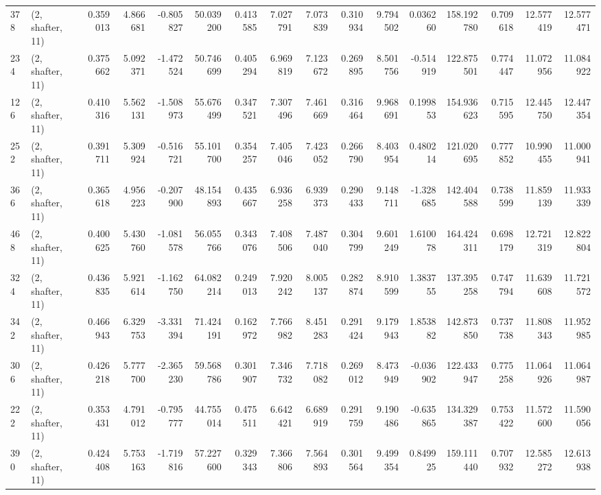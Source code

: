 \begin{tabular}{llrrrrrrrrrrrrrr}
378 &  (2, shafter, 11) &   0.359013 &   4.866681 &  -0.805827 &    50.039200 &   0.413585 &   7.027791 &   7.073839 &  0.310934 &   9.794502 &   0.036260 &   158.192780 &  0.709618 &  12.577419 &  12.577471 \\
234 &  (2, shafter, 11) &   0.375662 &   5.092371 &  -1.472524 &    50.746699 &   0.405294 &   6.969819 &   7.123672 &  0.269895 &   8.501756 &  -0.514919 &   122.875501 &  0.774447 &  11.072956 &  11.084922 \\
126 &  (2, shafter, 11) &   0.410316 &   5.562131 &  -1.508973 &    55.676499 &   0.347521 &   7.307496 &   7.461669 &  0.316464 &   9.968691 &   0.199853 &   154.936623 &  0.715595 &  12.445750 &  12.447354 \\
252 &  (2, shafter, 11) &   0.391711 &   5.309924 &  -0.516721 &    55.101700 &   0.354257 &   7.405046 &   7.423052 &  0.266790 &   8.403954 &   0.480214 &   121.020695 &  0.777852 &  10.990455 &  11.000941 \\
366 &  (2, shafter, 11) &   0.365618 &   4.956223 &  -0.207900 &    48.154893 &   0.435667 &   6.936258 &   6.939373 &  0.290433 &   9.148711 &  -1.328685 &   142.404588 &  0.738599 &  11.859139 &  11.933339 \\
468 &  (2, shafter, 11) &   0.400625 &   5.430760 &  -1.081578 &    56.055766 &   0.343076 &   7.408506 &   7.487040 &  0.304799 &   9.601249 &   1.610078 &   164.424311 &  0.698179 &  12.721319 &  12.822804 \\
324 &  (2, shafter, 11) &   0.436835 &   5.921614 &  -1.162750 &    64.082214 &   0.249013 &   7.920242 &   8.005137 &  0.282874 &   8.910599 &   1.383755 &   137.395258 &  0.747794 &  11.639608 &  11.721572 \\
342 &  (2, shafter, 11) &   0.466943 &   6.329753 &  -3.331394 &    71.424191 &   0.162972 &   7.766982 &   8.451283 &  0.291424 &   9.179943 &   1.853882 &   142.873850 &  0.737738 &  11.808343 &  11.952985 \\
306 &  (2, shafter, 11) &   0.426218 &   5.777700 &  -2.365230 &    59.568786 &   0.301907 &   7.346732 &   7.718082 &  0.269012 &   8.473949 &  -0.036902 &   122.433947 &  0.775258 &  11.064926 &  11.064987 \\
222 &  (2, shafter, 11) &   0.353431 &   4.791012 &  -0.795777 &    44.755014 &   0.475511 &   6.642421 &   6.689919 &  0.291759 &   9.190486 &  -0.635865 &   134.329387 &  0.753422 &  11.572600 &  11.590056 \\
390 &  (2, shafter, 11) &   0.424408 &   5.753163 &  -1.719816 &    57.227600 &   0.329343 &   7.366806 &   7.564893 &  0.301564 &   9.499354 &   0.849925 &   159.111440 &  0.707932 &  12.585272 &  12.613938 \\

\end{tabular}
